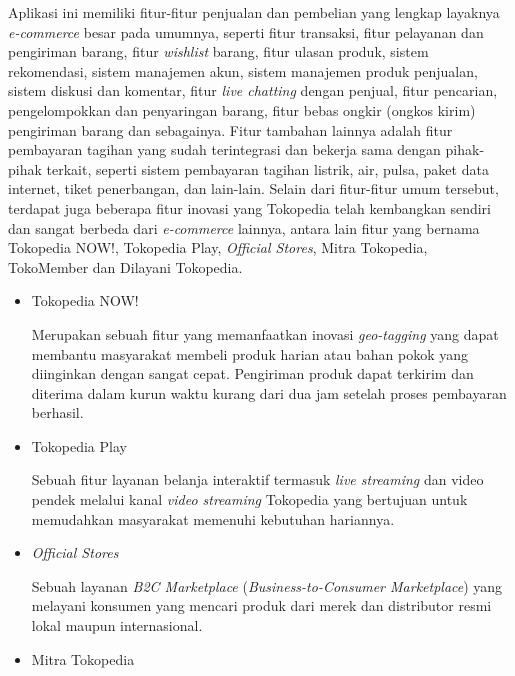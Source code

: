 \documentclass[a4paper]{article}
\begin{document}
\begin{itemize}
\begin{enumerate}
        Aplikasi ini memiliki fitur-fitur penjualan dan pembelian yang lengkap layaknya \textit{e-commerce} besar pada umumnya, seperti fitur transaksi, fitur pelayanan dan pengiriman barang, fitur \textit{wishlist} barang, fitur ulasan produk, sistem rekomendasi, sistem manajemen akun, sistem manajemen produk penjualan, sistem diskusi dan komentar, fitur \textit{live chatting} dengan penjual, fitur pencarian, pengelompokkan dan penyaringan barang, fitur bebas ongkir (ongkos kirim) pengiriman barang dan sebagainya. Fitur tambahan lainnya adalah fitur pembayaran tagihan yang sudah terintegrasi dan bekerja sama dengan pihak-pihak terkait, seperti sistem pembayaran tagihan listrik, air, pulsa, paket data internet, tiket penerbangan, dan lain-lain\autocite{web-tokped}. Selain dari fitur-fitur umum tersebut, terdapat juga beberapa fitur inovasi yang Tokopedia telah kembangkan sendiri dan sangat berbeda dari \textit{e-commerce} lainnya, antara lain fitur yang bernama Tokopedia NOW!, Tokopedia Play, \textit{Official Stores}, Mitra Tokopedia, TokoMember dan Dilayani Tokopedia\autocite{inovasi-tokped}.

        \begin{itemize}
            \item Tokopedia NOW!
            
            Merupakan sebuah fitur yang memanfaatkan inovasi \textit{geo-tagging} yang dapat membantu masyarakat membeli produk harian atau bahan pokok yang diinginkan dengan sangat cepat. Pengiriman produk dapat terkirim dan diterima dalam kurun waktu kurang dari dua jam setelah proses pembayaran berhasil\autocite{inovasi-tokped}.

            \item Tokopedia Play
            
            Sebuah fitur layanan belanja interaktif termasuk \textit{live streaming} dan video pendek melalui kanal \textit{video streaming} Tokopedia yang bertujuan untuk memudahkan masyarakat memenuhi kebutuhan hariannya\autocite{inovasi-tokped}.

            \item \textit{Official Stores}
            
            Sebuah layanan \textit{B2C Marketplace} (\textit{Business-to-Consumer Marketplace}) yang melayani konsumen yang mencari produk dari merek dan distributor resmi lokal maupun internasional\autocite{inovasi-tokped}.

            \item Mitra Tokopedia
            

\end{itemize}
\end{enumerate}
\end{itemize}
\end{document}
